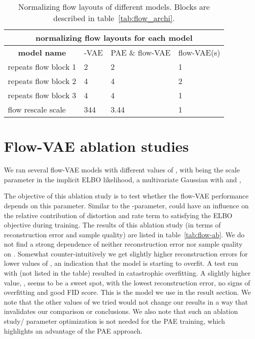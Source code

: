 \documentclass[10pt]{article} \usepackage[accepted]{tmlr}
\begin{document}
\begin{table}[h]
\begin{center}
\begin{tabular}{llll}
\multicolumn{4}{c}{\textbf{normalizing flow layouts for each model}}           \\ \hline
\multicolumn{1}{c|}{\textbf{model name}}   & \multicolumn{1}{c|}{-VAE} & \multicolumn{1}{c|}{PAE \& flow-VAE}                   & \multicolumn{1}{c}{flow-VAE(s)} \\ \hline
\multicolumn{1}{l|}{repeats flow block 1}  & \multicolumn{1}{l|}{2}                    & \multicolumn{1}{l|}{2}                     & 1                                  \\
\multicolumn{1}{l|}{repeats flow block 2}  & \multicolumn{1}{l|}{4}                    & \multicolumn{1}{l|}{4}                     & 2                                  \\
\multicolumn{1}{l|}{repeats flow block 3}  & \multicolumn{1}{l|}{4}                    & \multicolumn{1}{l|}{4}                     & 1                                  \\
\multicolumn{1}{l|}{flow rescale scale}    & \multicolumn{1}{l|}{344}                 & \multicolumn{1}{l|}{3.44}                  & 1                                  \\
\end{tabular}
\caption{\label{tab:flows} Normalizing flow layouts of different models. Blocks are described in table~\ref{tab:flow_archi}.}
\end{center}
\end{table}


\section{Flow-VAE ablation studies}
\label{app:sigma}
We ran several flow-VAE models with different values of , with  being the scale parameter in the implicit ELBO likelihood, a multivariate Gaussian with  and , 

The objective of this ablation study is to test whether the flow-VAE performance depends on this parameter. Similar to the -parameter,  could have an influence on the relative contribution of distortion and rate term to satisfying the ELBO objective during training. The results of this ablation study (in terms of reconstruction error and sample quality) are listed in table~\ref{tab:flow-ab}. We do not find a strong dependence of neither reconstruction error nor sample quality on . Somewhat counter-intuitively we get slightly higher reconstruction errors for lower values of , an indication that the model is starting to overfit. A test run with  (not listed in the table) resulted in catastrophic overfitting. 
A slightly higher value, 
, seems to be a sweet spot, with the lowest reconstruction error, no signs of overfitting and good FID score. This is the model we use in the result section. We note that the other values of  we tried would not change our results in a way that invalidates our comparison or conclusions. 
We also note that such an ablation study/ parameter optimization is not needed for the PAE training, which highlights an advantage of the PAE approach.
\end{document}
